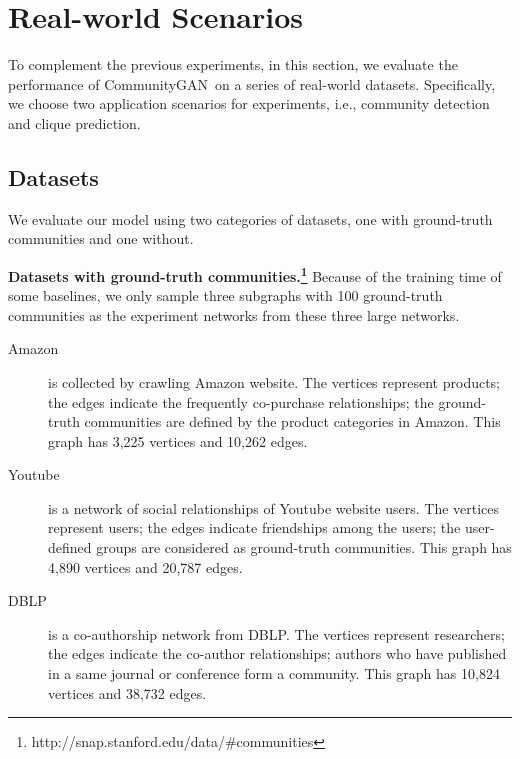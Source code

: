\documentclass[sigconf]{acmart}
\newcommand{\ComGAN}{CommunityGAN}
\begin{document}
\section{Real-world Scenarios}

To complement the previous experiments, in this section, we evaluate the performance of \ComGAN~on a series of real-world datasets.
Specifically, we choose two application scenarios for experiments, i.e., community detection and clique prediction.
\subsection{Datasets}

We evaluate our model using two categories of datasets, one with ground-truth communities and one without.

\vspace{5pt}\noindent\textbf{Datasets with ground-truth communities.\footnote{http://snap.stanford.edu/data/\#communities}}
Because of the training time of some baselines, we only sample three subgraphs with 100 ground-truth communities as the experiment networks from these three large networks.
\begin{description}
  \item[Amazon] is collected by crawling Amazon website.
  The vertices represent products; the edges indicate the frequently co-purchase relationships; the ground-truth communities are defined by the product categories in Amazon.
  This graph has 3,225 vertices and 10,262 edges.
  \item[Youtube] is a network of social relationships of Youtube website users.
  The vertices represent users; the edges indicate friendships among the users; the user-defined groups are considered as ground-truth communities.
  This graph has 4,890 vertices and 20,787 edges.
  \item[DBLP] is a co-authorship network from DBLP.
  The vertices represent researchers; the edges indicate the co-author relationships; authors who have published in a same journal or conference form a community.
  This graph has 10,824 vertices and 38,732 edges.
\end{description}
\end{document}
